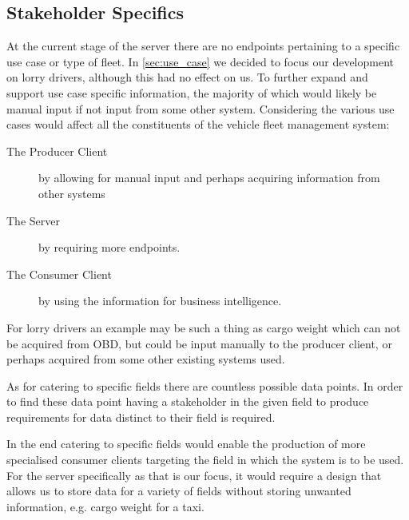 \subsection{Stakeholder Specifics}
%
%
At the current stage of the server there are no endpoints pertaining to a specific use case or type of fleet.
In \cref{sec:use_case} we decided to focus our development on lorry drivers, although this had no effect on us.
To further expand and support use case specific information, the majority of which would likely be manual input if not input from some other system.
Considering the various use cases would affect all the constituents of the vehicle fleet management system:
\begin{description}
    \item [The Producer Client] by allowing for manual input and perhaps acquiring information from other systems
    \item [The Server] by requiring more endpoints.
    \item [The Consumer Client] by using the information for business intelligence.
\end{description}
For lorry drivers an example may be such a thing as cargo weight which can not be acquired from \ac{OBD}, but could be input manually to the producer client, or perhaps acquired from some other existing systems used.

As for catering to specific fields there are countless possible data points.
In order to find these data point having a stakeholder in the given field to produce requirements for data distinct to their field is required.

In the end catering to specific fields would enable the production of more specialised consumer clients targeting the field in which the system is to be used.
For the server specifically as that is our focus, it would require a design that allows us to store data for a variety of fields without storing unwanted information, e.g. cargo weight for a taxi.

